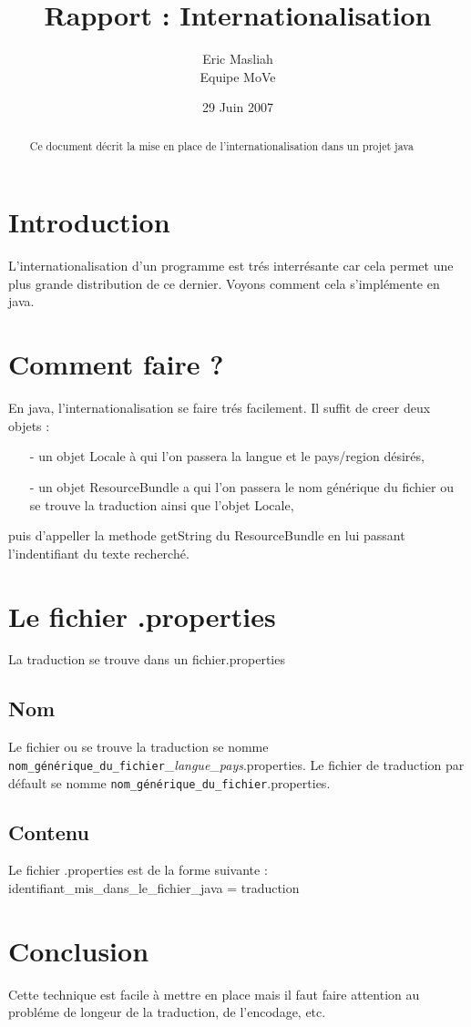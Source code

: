 \documentclass[a4paper,10pt]{article}
\title{Rapport : Internationalisation}
\author{Eric Masliah\\
Equipe MoVe}
\date{29 Juin 2007}
\begin{document}
\maketitle

\begin{abstract}
Ce document décrit la mise en place de l'internationalisation dans un projet java
\end{abstract}


\section{Introduction}
L'internationalisation d'un programme est trés interrésante car cela permet une plus grande distribution de ce dernier. Voyons comment cela s'implémente en java.

\section{Comment faire ?}
En java, l'internationalisation se faire trés facilement. Il suffit de creer deux objets :
\begin{itemize}
\item[-] un objet Locale à qui l'on passera la langue et le pays/region désirés,
\item[-] un objet ResourceBundle a qui l'on passera le nom générique du fichier ou se trouve la traduction ainsi que l'objet Locale,
\end{itemize}
puis d'appeller la methode getString du ResourceBundle en lui passant l'indentifiant du texte recherché.

\section{Le fichier .properties}
La traduction se trouve dans un fichier.properties

\subsection{Nom}
Le fichier ou se trouve la traduction se nomme 
\texttt{nom\_générique\_du\_fichier}\_\textit{langue}\_\textit{pays}.properties. Le fichier de traduction par défault se nomme \texttt{nom\_générique\_du\_fichier}.properties.

\subsection{Contenu}
Le fichier .properties est de la forme suivante :\\
identifiant\_mis\_dans\_le\_fichier\_java = traduction


\section{Conclusion}
Cette technique est facile à mettre en place mais il faut faire attention au probléme de longeur de la traduction, de l'encodage, etc.
\end{document}

